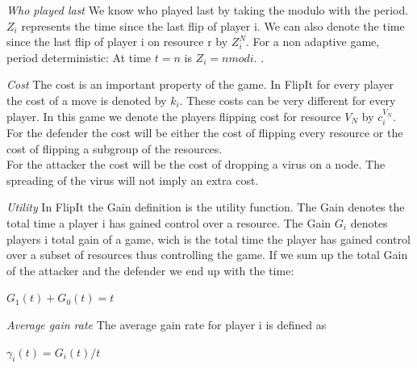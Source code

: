 \begin{description}
\item \textit{Who played last} We know who played last by taking the modulo with the period. $Z_{i}$ represents the time since the last flip of player i. We can also denote the time since the last flip of player i on resource r by $Z_{i}^{N}$. 
For a non adaptive game, period deterministic: At time $t=n$ is $Z_{i} = n mod i$.  .


\item \textit{Cost} The cost is an important property of the game. In FlipIt for every player the cost of a move is denoted by $k_{i}$. These costs can be very different for every player. In this game we denote the players flipping cost for resource $V_{N}$ by $c_{i}^{V_{N}}$. \\
For the defender the cost will be either the cost of flipping every resource or the cost of flipping a subgroup of the resources.\\
For the attacker the cost will be the cost of dropping a virus on a node. The spreading of the virus will not imply an extra cost. 

\item \textit{Utility} In FlipIt the Gain definition is the utility function. The Gain denotes the total time a player i has gained control over a resource. 
The Gain $G_{i}$ denotes players i total gain of a game, wich is the total time the player has gained control over a subset of resources thus controlling the game. If we sum up the total Gain of the attacker and the defender we end up with the time:
\begin{center}
$G_{1}(t) + G_{0}(t) = t$
\end{center}

\item \textit{Average gain rate} The average gain rate for player i is defined as
\begin{center}
$\gamma_{i}(t)= G_{i}(t)/t$
\end{center}


\end{description}
